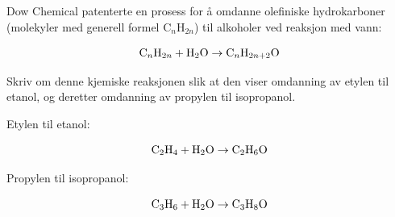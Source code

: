 
Dow Chemical patenterte en prosess for å omdanne olefiniske hydrokarboner (molekyler med generell formel C$_{n}$H$_{2n}$) til alkoholer ved reaksjon med vann:

$$\hbox{C}_n\hbox{H}_{2n} + \hbox{H}_2\hbox{O} \to \hbox{C}_n\hbox{H}_{2n+2}\hbox{O}$$

Skriv om denne kjemiske reaksjonen slik at den viser omdanning av etylen til etanol, og deretter omdanning av propylen til isopropanol.







\noindent
Etylen til etanol:

$$\hbox{C}_2\hbox{H}_{4} + \hbox{H}_2\hbox{O} \to \hbox{C}_2\hbox{H}_{6}\hbox{O}$$

\vskip 10pt

\noindent
Propylen til isopropanol:

$$\hbox{C}_3\hbox{H}_{6} + \hbox{H}_2\hbox{O} \to \hbox{C}_3\hbox{H}_{8}\hbox{O}$$









